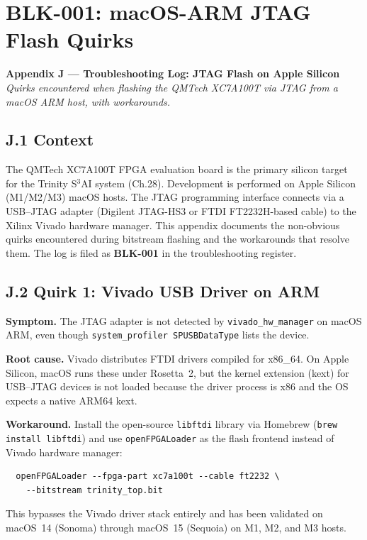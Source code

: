 \chapter{BLK-001: macOS-ARM JTAG Flash Quirks}
\label{app:J-blk001-jtag}

\begin{center}
\textbf{Appendix J --- Troubleshooting Log: JTAG Flash on Apple Silicon} \\[1em]
\textit{Quirks encountered when flashing the QMTech XC7A100T via JTAG
from a macOS ARM host, with workarounds.}
\end{center}

\section*{J.1 Context}
\label{app:J-context}

The QMTech XC7A100T FPGA evaluation board is the primary silicon
target for the Trinity S$^{3}$AI system (Ch.28). Development is
performed on Apple Silicon (M1/M2/M3) macOS hosts. The JTAG
programming interface connects via a USB--JTAG adapter (Digilent
JTAG-HS3 or FTDI FT2232H-based cable) to the Xilinx Vivado
hardware manager. This appendix documents the non-obvious quirks
encountered during bitstream flashing and the workarounds that
resolve them. The log is filed as \textbf{BLK-001} in the
troubleshooting register.

\section*{J.2 Quirk 1: Vivado USB Driver on ARM}
\label{app:J-quirk1}

\textbf{Symptom.} The JTAG adapter is not detected by
\texttt{vivado\_hw\_manager} on macOS ARM, even though
\texttt{system\_profiler SPUSBDataType} lists the device.

\textbf{Root cause.} Vivado distributes FTDI drivers compiled for
x86\_64. On Apple Silicon, macOS runs these under Rosetta~2, but the
kernel extension (kext) for USB--JTAG devices is not loaded because
the driver process is x86 and the OS expects a native ARM64 kext.

\textbf{Workaround.} Install the open-source \texttt{libftdi} library
via Homebrew (\texttt{brew install libftdi}) and use
\texttt{openFPGALoader} as the flash frontend instead of Vivado
hardware manager:
\begin{verbatim}
  openFPGALoader --fpga-part xc7a100t --cable ft2232 \
    --bitstream trinity_top.bit
\end{verbatim}
This bypasses the Vivado driver stack entirely and has been validated
on macOS~14 (Sonoma) through macOS~15 (Sequoia) on M1, M2, and M3
hosts.

